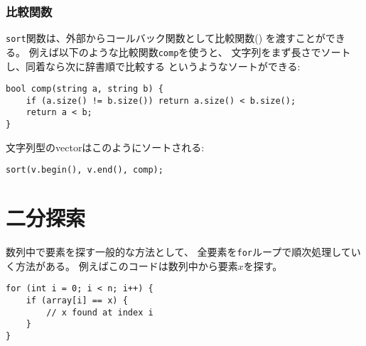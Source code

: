 \subsubsection{比較関数}


\texttt{sort}関数は、外部からコールバック関数として比較関数()
を渡すことができる。
例えば以下のような比較関数\texttt{comp}を使うと、
文字列をまず長さでソートし、同着なら次に辞書順で比較する
というようなソートができる:

\begin{lstlisting}
bool comp(string a, string b) {
    if (a.size() != b.size()) return a.size() < b.size();
    return a < b;
}
\end{lstlisting}
\begin{comment}
Now a vector of strings can be sorted as follows:
\end{comment}
文字列型のvectorはこのようにソートされる:
\begin{lstlisting}
sort(v.begin(), v.end(), comp);
\end{lstlisting}

\begin{comment}
\section{Binary search}

\index{binary search}

A general method for searching for an element
in an array is to use a \texttt{for} loop
that iterates through the elements of the array.
For example, the following code searches for
an element $x$ in an array:
\end{comment}

\section{二分探索}


数列中で要素を探す一般的な方法として、
全要素を\texttt{for}ループで順次処理していく方法がある。
例えばこのコードは数列中から要素$x$を探す。

\begin{lstlisting}
for (int i = 0; i < n; i++) {
    if (array[i] == x) {
        // x found at index i
    }
}
\end{lstlisting}


